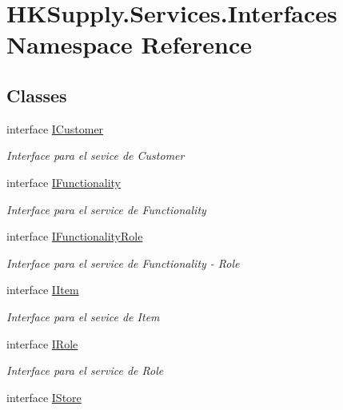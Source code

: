 \hypertarget{namespace_h_k_supply_1_1_services_1_1_interfaces}{}\section{H\+K\+Supply.\+Services.\+Interfaces Namespace Reference}
\label{namespace_h_k_supply_1_1_services_1_1_interfaces}
\subsection*{Classes}
\begin{DoxyCompactItemize}
\item 
interface \hyperlink{interface_h_k_supply_1_1_services_1_1_interfaces_1_1_i_customer}{I\+Customer}
\begin{DoxyCompactList}\small\item\em Interface para el sevice de Customer \end{DoxyCompactList}\item 
interface \hyperlink{interface_h_k_supply_1_1_services_1_1_interfaces_1_1_i_functionality}{I\+Functionality}
\begin{DoxyCompactList}\small\item\em Interface para el service de Functionality \end{DoxyCompactList}\item 
interface \hyperlink{interface_h_k_supply_1_1_services_1_1_interfaces_1_1_i_functionality_role}{I\+Functionality\+Role}
\begin{DoxyCompactList}\small\item\em Interface para el service de Functionality -\/ Role \end{DoxyCompactList}\item 
interface \hyperlink{interface_h_k_supply_1_1_services_1_1_interfaces_1_1_i_item}{I\+Item}
\begin{DoxyCompactList}\small\item\em Interface para el sevice de Item \end{DoxyCompactList}\item 
interface \hyperlink{interface_h_k_supply_1_1_services_1_1_interfaces_1_1_i_role}{I\+Role}
\begin{DoxyCompactList}\small\item\em Interface para el service de Role \end{DoxyCompactList}\item 
interface \hyperlink{interface_h_k_supply_1_1_services_1_1_interfaces_1_1_i_store}{I\+Store}

\end{DoxyCompactItemize}
